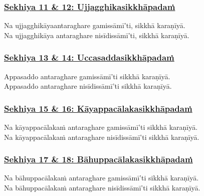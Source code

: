 \subsubsection*{\hyperref[training11-12]{Sekhiya 11 \& 12: Ujjagghikasikkhāpadaṁ}}
\label{sekh11-12}

Na ujjagghikāya\makeatletter\hyperlink{endnote475-appendix}\makeatother \thinspace antaraghare gamissāmī'ti, sikkhā karaṇīyā.\\
Na ujjagghikāya antaraghare nisīdissāmī'ti, sikkhā karaṇīyā.



\subsubsection*{\hyperref[training13-14]{Sekhiya 13 \& 14: Uccasaddasikkhāpadaṁ}}
\label{sekh13-14}

Appasaddo antaraghare gamissāmī'ti sikkhā karaṇīyā.\\
Appasaddo antaraghare nisīdissāmī'ti sikkhā karaṇīyā.



\subsubsection*{\hyperref[training15-16]{Sekhiya 15 \& 16: Kāyappacālakasikkhāpadaṁ}}
\label{sekh15-16}

Na kāyappacālakaṁ antaraghare gamissāmī'ti sikkhā karaṇīyā.\\
Na kāyappacālakaṁ antaraghare nisīdissāmī'ti sikkhā karaṇīyā.



\subsubsection*{\hyperref[training17-18]{Sekhiya 17 \& 18: Bāhuppacālakasikkhāpadaṁ}}
\label{sekh17-18}

Na bāhuppacālakaṁ antaraghare gamissāmī'ti sikkhā karaṇīyā.\\
Na bāhuppacālakaṁ antaraghare nisīdissāmī'ti sikkhā karaṇīyā.



